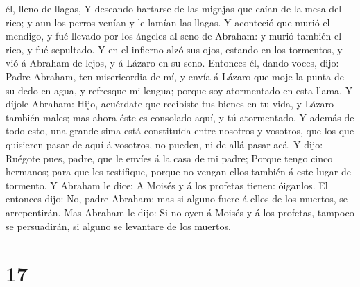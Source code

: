 él, lleno de llagas,  Y deseando hartarse de las migajas
que caían de la mesa del rico; y aun los perros venían y le lamían las
llagas.  Y aconteció que murió el mendigo, y fué llevado
por los ángeles al seno de Abraham: y murió también el rico, y fué
sepultado.  Y en el infierno alzó sus ojos, estando en
los tormentos, y vió á Abraham de lejos, y á Lázaro en su seno.
 Entonces él, dando voces, dijo: Padre Abraham, ten
misericordia de mí, y envía á Lázaro que moje la punta de su dedo en
agua, y refresque mi lengua; porque soy atormentado en esta llama.
 Y díjole Abraham: Hijo, acuérdate que recibiste tus
bienes en tu vida, y Lázaro también males; mas ahora éste es consolado
aquí, y tú atormentado.  Y además de todo esto, una
grande sima está constituída entre nosotros y vosotros, que los que
quisieren pasar de aquí á vosotros, no pueden, ni de allá pasar acá.
 Y dijo: Ruégote pues, padre, que le envíes á la casa de
mi padre;  Porque tengo cinco hermanos; para que les
testifique, porque no vengan ellos también á este lugar de tormento.
 Y Abraham le dice: A Moisés y á los profetas tienen:
óiganlos.  El entonces dijo: No, padre Abraham: mas si
alguno fuere á ellos de los muertos, se arrepentirán. 
Mas Abraham le dijo: Si no oyen á Moisés y á los profetas, tampoco se
persuadirán, si alguno se levantare de los muertos.

\hypertarget{section-16}{%
\section{17}\label{section-16}}

